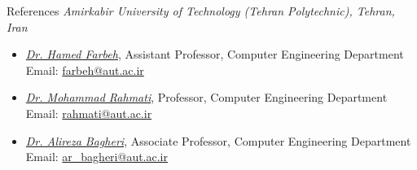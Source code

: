\documentclass{resume}
\begin{document}
\begin{rSection}{References}
    {\em Amirkabir University of Technology (Tehran Polytechnic), Tehran, Iran}
    \vspace{-0.5em}
    \begin{itemize}[topsep=0pt, label=$\circ$, leftmargin=1em]
        \item {\textit{\href{https://scholar.google.com/citations?user=PAZOYiAAAAAJ&hl=en}{Dr. Hamed Farbeh}}}, Assistant Professor, Computer Engineering Department\\
        Email: \href{mailto:farbeh@aut.ac.ir}{farbeh@aut.ac.ir}
        
        \item {\textit{\href{https://scholar.google.com/citations?user=EYk7M80AAAAJ&hl=en}{Dr. Mohammad Rahmati}}}, Professor, Computer Engineering Department\\
        Email: \href{mailto:rahmati@aut.ac.ir}{rahmati@aut.ac.ir}

        \item {\textit{\href{https://scholar.google.com/citations?user=MYvL3dMAAAAJ&hl=en}{Dr. Alireza Bagheri}}}, Associate Professor, Computer Engineering Department\\
        Email: \href{mailto:ar_bagheri@aut.ac.ir}{ar\_bagheri@aut.ac.ir}

    \end{itemize}
\end{rSection}
\end{document}
